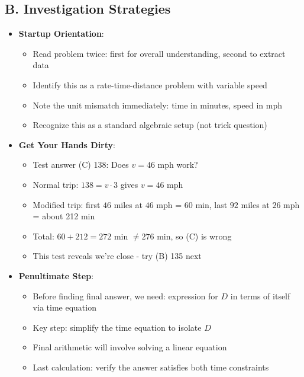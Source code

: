 \documentclass[11pt]{article}
\begin{document}
\begin{strategicbox}
\subsection*{B. Investigation Strategies}
\begin{itemize}[leftmargin=*]
    \item \textbf{Startup Orientation}: 
    \begin{itemize}[leftmargin=*]
        \item Read problem twice: first for overall understanding, second to extract data
        \item Identify this as a rate-time-distance problem with variable speed
        \item Note the unit mismatch immediately: time in minutes, speed in mph
        \item Recognize this as a standard algebraic setup (not trick question)
    \end{itemize}
    
    \item \textbf{Get Your Hands Dirty}: 
    \begin{itemize}[leftmargin=*]
        \item Test answer (C) 138: Does $v = 46$ mph work?
        \item Normal trip: $138 = v \cdot 3$ gives $v = 46$ mph
        \item Modified trip: first $46$ miles at $46$ mph = 60 min, last $92$ miles at $26$ mph = about 212 min
        \item Total: $60 + 212 = 272$ min $\neq 276$ min, so (C) is wrong
        \item This test reveals we're close - try (B) 135 next
    \end{itemize}
    
    \item \textbf{Penultimate Step}: 
    \begin{itemize}[leftmargin=*]
        \item Before finding final answer, we need: expression for $D$ in terms of itself via time equation
        \item Key step: simplify the time equation to isolate $D$
        \item Final arithmetic will involve solving a linear equation
        \item Last calculation: verify the answer satisfies both time constraints
    \end{itemize}
    

\end{itemize}
\end{strategicbox}
\end{document}
